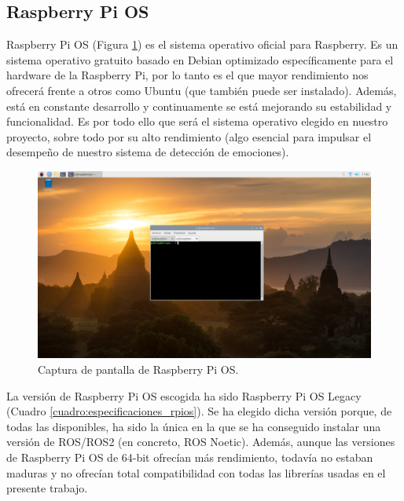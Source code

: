 \subsection{Raspberry Pi OS}
\label{sec:raspberry_pi_os}

Raspberry Pi OS (Figura \ref{fig:captura_rpios}) es el sistema operativo oficial para Raspberry. Es un sistema operativo gratuito basado en Debian optimizado específicamente para el hardware de la Raspberry Pi, por lo tanto es el que mayor rendimiento nos ofrecerá frente a otros como Ubuntu (que también puede ser instalado). Además, está en constante desarrollo y continuamente se está mejorando su estabilidad y funcionalidad. Es por todo ello que será el sistema operativo elegido en nuestro proyecto, sobre todo por su alto rendimiento (algo esencial para impulsar el desempeño de nuestro sistema de detección de emociones).\\

\begin{figure} [h!]
  \begin{center}
    \includegraphics[width=13cm]{figs/captura_rpios.png}
  \end{center}
  \caption{Captura de pantalla de Raspberry Pi OS.}
  \label{fig:captura_rpios}
\end{figure}

La versión de Raspberry Pi OS escogida ha sido Raspberry Pi OS Legacy (Cuadro \ref{cuadro:especificaciones_rpios}). Se ha elegido dicha versión porque, de todas las disponibles, ha sido la única en la que se ha conseguido instalar una versión de ROS/ROS2 (en concreto, ROS Noetic). Además, aunque las versiones de Raspberry Pi OS de 64-bit ofrecían más rendimiento, todavía no estaban maduras y no ofrecían total compatibilidad con todas las librerías usadas en el presente trabajo.


